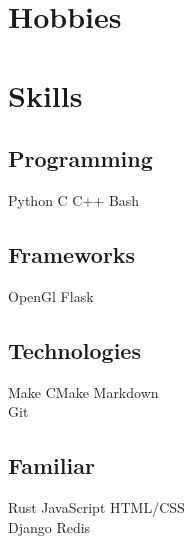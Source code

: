 \documentclass[]{resume-openfont}
\begin{document}
\begin{minipage}[t]{0.33\textwidth}
\section{Hobbies}
\sectionsep

\vspace{-2mm} %

\section{Skills}
\subsection{Programming}
Python \textbullet{} C \textbullet{} C++ \textbullet{} Bash
\sectionsep
\subsection{Frameworks}
OpenGl \textbullet{} Flask
\sectionsep
\subsection{Technologies}
Make  \textbullet{} CMake \textbullet{} Markdown \\
Git
\sectionsep
\subsection{Familiar}
Rust \textbullet{} JavaScript\textbullet{} HTML/CSS \\
Django \textbullet{} Redis
\sectionsep

%
%

\end{minipage}
\hfill
\end{document}
